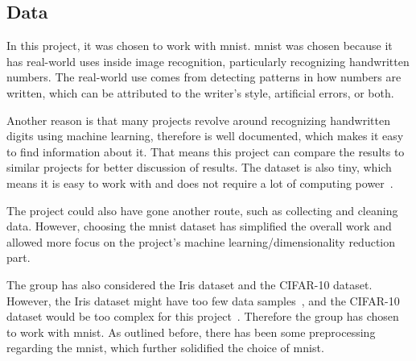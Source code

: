 \subsection{Data}\label{sec:data}
In this project, it was chosen to work with \gls{mnist}. \gls{mnist} was chosen because it has real-world uses inside image recognition, particularly recognizing handwritten numbers. The real-world use comes from detecting patterns in how numbers are written, which can be attributed to the writer's style, artificial errors, or both. 

Another reason is that many projects revolve around recognizing handwritten digits using machine learning, therefore is well documented, which makes it easy to find information about it. That means this project can compare the results to similar projects for better discussion of results. The dataset is also tiny, which means it is easy to work with and does not require a lot of computing power~\cite{lecun-mnist-database}.

The project could also have gone another route, such as collecting and cleaning data. However, choosing the \gls{mnist} dataset has simplified the overall work and allowed more focus on the project's machine learning/dimensionality reduction part. 

The group has also considered the Iris dataset and the CIFAR-10 dataset. However, the Iris dataset might have too few data samples~\cite{mnist-vs-iris}, and the CIFAR-10 dataset would be too complex for this project~\cite{datasets-uniqtech}. Therefore the group has chosen to work with \gls{mnist}. As outlined before, there has been some preprocessing regarding the \gls{mnist}, which further solidified the choice of \gls{mnist}.





